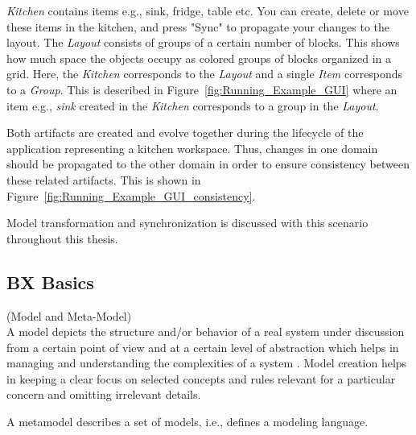 \textit{Kitchen} contains items e.g., sink, fridge, table etc. You can create, delete or move these items in the kitchen, and press "Sync" to propagate your changes to the layout. The \textit{Layout} consists of groups of a certain number of blocks. This shows how much space the objects occupy as colored groups of blocks organized in a grid. Here, the \textit{Kitchen} corresponds to the \textit{Layout} and a single \textit{Item} corresponds to a \textit{Group}. This is described in Figure~\ref{fig:Running_Example_GUI} where an item e.g., \textit{sink} created in the \textit{Kitchen} corresponds to a group in the \textit{Layout}.

Both artifacts are created and evolve together during the lifecycle of the application representing a kitchen workspace. Thus, changes in one domain should be propagated to the other domain in order to ensure consistency between these related artifacts. This is shown in Figure~\ref{fig:Running_Example_GUI_consistency}.

Model transformation and synchronization is discussed with this scenario throughout this thesis. 

\subsection{BX Basics}\label{subsec:definitions}

\begin{defn}\label{defModel} (Model and Meta-Model)\\
A model depicts the structure and/or behavior of a real system under discussion from a certain point of view and at a certain level of abstraction which helps in managing and understanding the complexities of a system \cite{uml} \cite{mdsd}. Model creation helps in keeping a clear focus on selected concepts and rules relevant for a particular concern and omitting irrelevant details.

A metamodel describes a set of models, i.e., defines a modeling language. 
\end{defn} 


